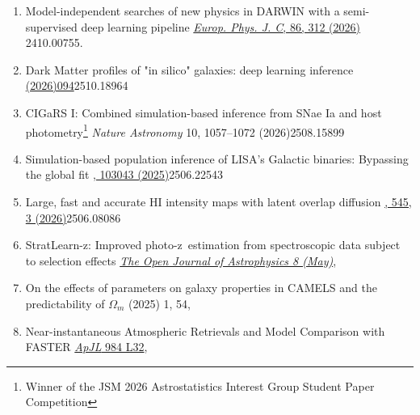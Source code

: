 \begin{enumerate}
\item
{}
{Model-independent searches of new physics in DARWIN with a semi-supervised deep learning pipeline}
{\href{https://doi.org/10.1140/epjc/s10052-025-15161-2}{{\em Europ. Phys. J. C}, 86, 312 (2026)}}
{2410.00755}.  

\item
{}
{Dark Matter profiles of "in silico" galaxies: deep learning inference}
{\href{https://doi.org/10.1088/1475-7516/2026/05/094https://doi.org/10.1088/1475-7516/2026/05/094}{(2026)094}}{2510.18964}

\item {}
{CIGaRS I: Combined simulation-based inference from SNae Ia and host photometry\footnote{Winner of the JSM 2026 Astrostatistics Interest Group Student Paper Competition}}
{{\em Nature Astronomy} 10, 1057–1072 (2026)}{2508.15899}

\item {}
{Simulation-based population inference of LISA's Galactic binaries: Bypassing the global fit}
{\href{https://doi.org/10.1103/shym-w46f}{, 103043 (2025)}}{2506.22543}

\item  {}
{Large, fast and accurate HI intensity maps with latent overlap diffusion}
{\href{https://doi.org/10.1093/mnras/staf2071}{\mnras, 545, 3 (2026)}}{2506.08086}

\item {}
{StratLearn-z: Improved photo-z estimation from spectroscopic data subject to selection effects}
{\href{https://doi.org/10.33232/001c.137525}{\em The Open Journal of Astrophysics 8 (May)}, }

\item {}
{On the effects of parameters on galaxy properties in CAMELS and the predictability of $\Omega_m$}
{ (2025) 1, 54, } 

\item  {}
{Near-instantaneous Atmospheric Retrievals and Model Comparison with FASTER}
{\href{http://doi.org/10.3847/2041-8213/adc7aa}{{\em ApJL} 984 L32}, }


\end{enumerate}
